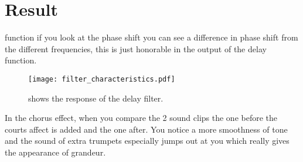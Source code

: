 
\section{Result}
function if you look at the phase shift you can see a difference in phase shift from the different frequencies,
this is just honorable in the output of the delay function.


\begin{figure}[!hbt]
	\centering
	\texttt{[image: filter\_characteristics.pdf]}
	\caption{shows the response of the delay filter.}
	\label{fig:response}
\end{figure}


In the chorus effect, when you compare the 2 sound clips the one before the courts affect is added and the one after.
You notice a more smoothness of tone and the sound of extra trumpets especially jumps out at you which really gives the appearance of grandeur.
